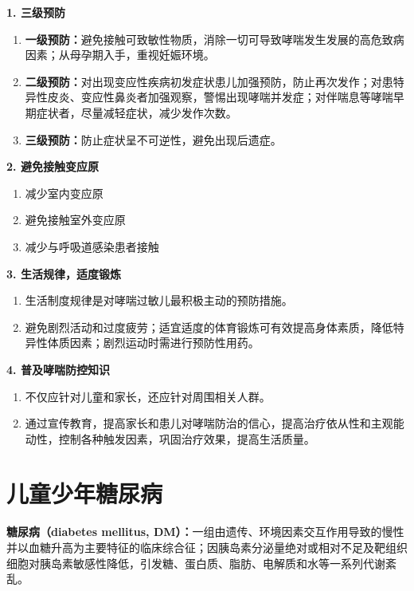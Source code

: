 \begin{keybox}
\textbf{1. 三级预防}
\begin{enumerate}[leftmargin=*]
    \item \textbf{一级预防：}避免接触可致敏性物质，消除一切可导致哮喘发生发展的高危致病因素；从母孕期入手，重视妊娠环境。
    \item \textbf{二级预防：}对出现变应性疾病初发症状患儿加强预防，防止再次发作；对患特异性皮炎、变应性鼻炎者加强观察，警惕出现哮喘并发症；对伴喘息等哮喘早期症状者，尽量减轻症状，减少发作次数。
    \item \textbf{三级预防：}防止症状呈不可逆性，避免出现后遗症。
\end{enumerate}

\textbf{2. 避免接触变应原}
\begin{enumerate}[leftmargin=*]
    \item 减少室内变应原
    \item 避免接触室外变应原
    \item 减少与呼吸道感染患者接触
\end{enumerate}

\textbf{3. 生活规律，适度锻炼}
\begin{enumerate}[leftmargin=*]
    \item 生活制度规律是对哮喘过敏儿最积极主动的预防措施。
    \item 避免剧烈活动和过度疲劳；适宜适度的体育锻炼可有效提高身体素质，降低特异性体质因素；剧烈运动时需进行预防性用药。
\end{enumerate}

\textbf{4. 普及哮喘防控知识}
\begin{enumerate}[leftmargin=*]
    \item 不仅应针对儿童和家长，还应针对周围相关人群。
    \item 通过宣传教育，提高家长和患儿对哮喘防治的信心，提高治疗依从性和主观能动性，控制各种触发因素，巩固治疗效果，提高生活质量。
\end{enumerate}
\end{keybox}

\section{儿童少年糖尿病}

\begin{defbox}
\textbf{糖尿病（diabetes mellitus, DM）：}一组由遗传、环境因素交互作用导致的慢性并以血糖升高为主要特征的临床综合征；因胰岛素分泌量绝对或相对不足及靶组织细胞对胰岛素敏感性降低，引发糖、蛋白质、脂肪、电解质和水等一系列代谢紊乱。
\end{defbox}

